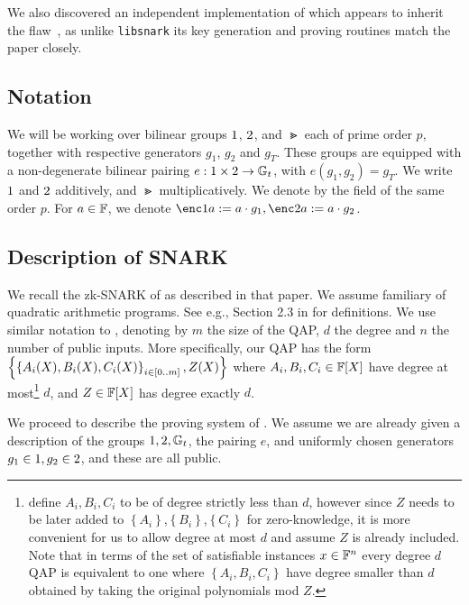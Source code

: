 \documentclass[11pt]{article}
\numberwithin{figure}{section} %
\newcommand{\set}[1]{\ensuremath{\left\{#1\right\}}\xspace}
\begin{document}
We also discovered an independent implementation of \cite{BCTV} which appears to inherit the flaw~\cite{snarkjs}, as unlike \texttt{libsnark} its key generation and proving routines match the paper closely.

\subsection{Notation}
We will be working over bilinear groups $\G1$, $\G2$, and $\Gt$ each of prime order $p$, together with respective generators $g_1$, $g_2$ and $g_T$.
These groups are equipped with a non-degenerate bilinear pairing $e:\G1 \times \G2 \to \Gt$, with $e(g_1, g_2) = g_T$.
We write $\G1$ and $\G2$ additively, and $\Gt$ multiplicatively.
We denote by \F the field of the same order $p$.
For $a \in \mathbb F$, we denote $\enc1{a}\defeq a\cdot g_1, \enc2{a}\defeq a\cdot g_2$.

\subsection{Description of \cite{BCTV} SNARK}\label{subsec:bctv}

We recall the zk-SNARK of \cite{BCTV} as described in that paper.
We assume familiary of quadratic arithmetic programs.
See e.g., Section 2.3 in \cite{groth16} for definitions.
We use similar notation to \cite{BCTV}, denoting by $m$ the size of the QAP, $d$ the degree and $n$ the number of public inputs.
More specifically, our QAP has the form \set{\sett{A_i(X),B_i(X),C_i(X)}{i\in [0..m]}, Z(X)}
where $A_i,B_i,C_i\in \mathbb F[X]$ have degree at most\footnote{\cite{BCTV} define $A_i,B_i,C_i$ to be of degree strictly less than $d$, however since $Z$ needs to be later added to \set{A_i},\set{B_i},\set{C_i} for zero-knowledge, it is more convenient for us to allow degree at most $d$ and assume $Z$ is already included. Note that in terms of the set of satisfiable instances $x\in \mathbb F^n$ every degree $d$ QAP is equivalent to one where \set{A_i,B_i,C_i} have degree smaller than $d$ obtained by taking the original polynomials mod $Z$.} $d$, and $Z\in \mathbb F[X]$ has degree exactly $d$.


We proceed to describe the proving system of \cite{BCTV}.
We assume we are already given a description of the groups $\G1,\G2,\Gt$, the pairing $e$, and uniformly chosen generators 
$g_1\in \G1,g_2\in \G2$, and these are all public.
\end{document}

